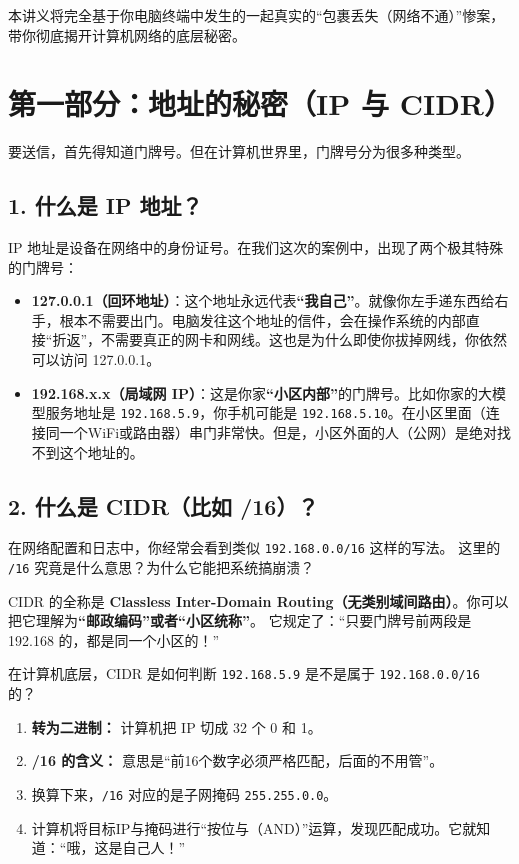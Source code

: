 \documentclass[12pt,a4paper]{ctexart}
\begin{document}
本讲义将完全基于你电脑终端中发生的一起真实的“包裹丢失（网络不通）”惨案，带你彻底揭开计算机网络的底层秘密。

\newpage
\section{第一部分：地址的秘密（IP 与 CIDR）}

要送信，首先得知道门牌号。但在计算机世界里，门牌号分为很多种类型。

\subsection{1. 什么是 IP 地址？}
IP 地址是设备在网络中的身份证号。在我们这次的案例中，出现了两个极其特殊的门牌号：
\begin{itemize}
    \item \textbf{127.0.0.1（回环地址）}：这个地址永远代表\textbf{“我自己”}。就像你左手递东西给右手，根本不需要出门。电脑发往这个地址的信件，会在操作系统的内部直接“折返”，不需要真正的网卡和网线。这也是为什么即使你拔掉网线，你依然可以访问 127.0.0.1。
    \item \textbf{192.168.x.x（局域网 IP）}：这是你家\textbf{“小区内部”}的门牌号。比如你家的大模型服务地址是 \texttt{192.168.5.9}，你手机可能是 \texttt{192.168.5.10}。在小区里面（连接同一个WiFi或路由器）串门非常快。但是，小区外面的人（公网）是绝对找不到这个地址的。
\end{itemize}

\subsection{2. 什么是 CIDR（比如 /16）？}
在网络配置和日志中，你经常会看到类似 \texttt{192.168.0.0/16} 这样的写法。
这里的 \texttt{/16} 究竟是什么意思？为什么它能把系统搞崩溃？

CIDR 的全称是 \textbf{Classless Inter-Domain Routing（无类别域间路由）}。你可以把它理解为\textbf{“邮政编码”或者“小区统称”}。
它规定了：“只要门牌号前两段是 192.168 的，都是同一个小区的！”

\begin{tcolorbox}[colback=yellow!10,colframe=orange!80!black,title=硬核知识：掩码的二进制计算,fonttitle=\bfseries,boxrule=0.5pt,arc=3mm]
在计算机底层，CIDR 是如何判断 \texttt{192.168.5.9} 是不是属于 \texttt{192.168.0.0/16} 的？
\begin{enumerate}
    \item \textbf{转为二进制：} 计算机把 IP 切成 32 个 0 和 1。
    \item \textbf{/16 的含义：} 意思是“前16个数字必须严格匹配，后面的不用管”。
    \item 换算下来，\texttt{/16} 对应的是子网掩码 \texttt{255.255.0.0}。
    \item 计算机将目标IP与掩码进行“按位与（AND）”运算，发现匹配成功。它就知道：“哦，这是自己人！”
\end{enumerate}
\end{tcolorbox}
\end{document}
